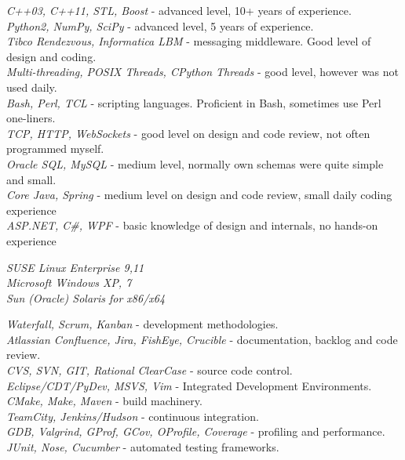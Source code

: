 \documentclass[10pt]{article} %
\begin{document}
{
\textit{C++03, C++11, STL, Boost} - advanced level, 10+ years of experience.\\
\textit{Python2, NumPy, SciPy} - advanced level, 5 years of experience.\\
\textit{Tibco Rendezvous, Informatica LBM} - messaging middleware. Good level of design and coding.\\
\textit{Multi-threading, POSIX Threads, CPython Threads} - good level, however was not used daily.\\
\textit{Bash, Perl, TCL} - scripting languages. Proficient in Bash, sometimes use Perl one-liners.\\
\textit{TCP, HTTP, WebSockets} - good level on design and code review, not often programmed myself.\\
\textit{Oracle SQL, MySQL} - medium level, normally own schemas were quite simple and small.\\
\textit{Core Java, Spring} - medium level on design and code review, small daily coding experience\\
\textit{ASP.NET, C\#, WPF} - basic knowledge of design and internals, no hands-on experience\\
}


{
\textit{SUSE Linux Enterprise 9,11}\\
\textit{Microsoft Windows XP, 7}\\
\textit{Sun (Oracle) Solaris for x86/x64}
}


{
\textit{Waterfall, Scrum, Kanban} - development methodologies.\\
\textit{Atlassian Confluence, Jira, FishEye, Crucible} - documentation, backlog and code review.\\
\textit{CVS, SVN, GIT, Rational ClearCase} - source code control.\\
\textit{Eclipse/CDT/PyDev, MSVS, Vim} - Integrated Development Environments.\\
\textit{CMake, Make, Maven} - build machinery.\\
\textit{TeamCity, Jenkins/Hudson} - continuous integration.\\
\textit{GDB, Valgrind, GProf, GCov, OProfile, Coverage} - profiling and performance.\\ 
\textit{JUnit, Nose, Cucumber} - automated testing frameworks.\\
}
\end{document}
